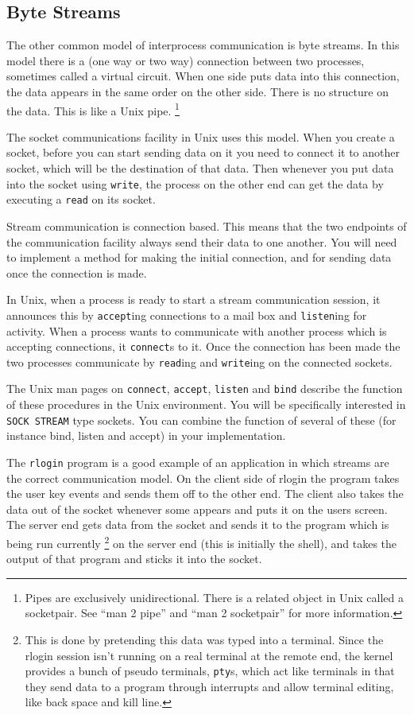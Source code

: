 \subsection{Byte Streams}

The other common model of interprocess communication is byte streams.  In
this model there is a (one way or two way) connection between two processes,
sometimes called a virtual circuit.  When one side puts data into this
connection, the data appears in the same order on the other side.  There is
no structure on the data.  This is like a Unix pipe.
\footnote{Pipes are exclusively unidirectional. There is a related
object in Unix called a socketpair.  See ``man 2 pipe'' and 
``man 2 socketpair'' for more information.}

The socket communications facility in Unix uses this model.  When you create
a socket, before you can start sending data on it you need to connect it to
another socket, which will be the destination of that data.  Then whenever
you put data into the socket using {\tt write}, the process on the other
end can get the data by executing a {\tt read} on its socket.

Stream communication is connection based.  This means that the two endpoints
of the communication facility always send their data to one another.  You
will need to implement a method for making the initial connection, and for
sending data once the connection is made.

In Unix,
when a process is ready to start a stream communication session, it 
announces this by {\tt accept}ing connections to a mail box
and {\tt listen}ing for activity.  When a
process wants to communicate with another process which is accepting
connections, it {\tt connect}s to it.  Once the connection has been
made the two processes communicate by {\tt read}ing and {\tt write}ing
on the connected sockets.

The Unix man pages on {\tt connect}, {\tt accept}, {\tt listen}
and {\tt bind} describe the function
of these procedures in the Unix environment.  You will be specifically
interested in {\tt SOCK STREAM} type sockets.  You can combine
the function of several of these (for instance bind, listen and accept)
in your implementation.

The {\tt rlogin} program is a good example of an application in which
streams are the correct communication model.  On the client side of 
rlogin the program takes the user key events and sends them off to the
other end.  The client also takes the data out of the socket whenever
some appears and puts it on the users screen.  The server end gets data
from the socket and sends it to the program which is being run currently
\footnote{This is done by pretending this data was typed into a terminal.
Since the rlogin session isn't running on a real terminal at the remote
end, the kernel provides a bunch of pseudo terminals, {\tt pty}s, which
act like terminals in that they send data to a program through interrupts
and allow terminal editing, like back space and kill line.}
on the server end (this is initially the shell), and takes the output
of that program and sticks it into the socket.  



